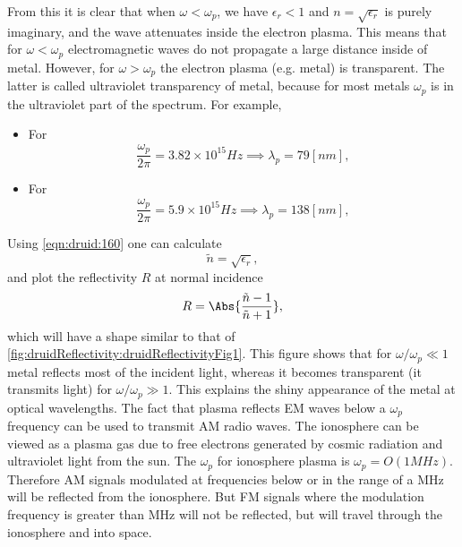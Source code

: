 %
From this it is clear that when \( \omega < \omega_p \), we have \( \epsilon_r < 1 \) and \( n = \sqrt{\epsilon_r} \) is purely imaginary, and the wave attenuates inside the electron plasma.
%
This means that for \( \omega < \omega_p \) electromagnetic waves do not propagate a large distance inside of metal.  However, for \( \omega > \omega_p \) the electron plasma (e.g. metal) is transparent.  The latter is called ultraviolet transparency of metal, because for most metals \( \omega_p \) is in the ultraviolet part of the spectrum.  For example,
%
\begin{itemize}
\item For 
\begin{dmath}\label{eqn:druid:180}
\frac{\omega_p}{2 \pi} = 3.82 \times 10^{15} \si{Hz} \implies \lambda_p = 79 [nm],
\end{dmath}
\item For 
\begin{dmath}\label{eqn:druid:200}
\frac{\omega_p}{2 \pi} = 5.9 \times 10^{15} \si{Hz} \implies \lambda_p = 138 [nm],
\end{dmath}
\end{itemize}
%
Using \cref{eqn:druid:160} one can calculate
%
\begin{dmath}\label{eqn:druid:220}
\tilde{n} = \sqrt{\epsilon_r},
\end{dmath}
%
and plot the reflectivity \( R \) at normal incidence
%
\begin{dmath}\label{eqn:druid:240}
R = \Abs{ \frac{\tilde{n} - 1 }{\tilde{n} + 1} },
\end{dmath}
%
which will have a shape similar to that of \cref{fig:druidReflectivity:druidReflectivityFig1}.
%
%
This figure shows that for \( \omega/\omega_p \ll 1 \) metal reflects most of the incident light, whereas it becomes transparent (it transmits light) for \( \omega/\omega_p \gg 1 \).  This explains the shiny appearance of the metal at optical wavelengths.
%
The fact that plasma reflects EM waves below a \( \omega_p \) frequency can be used to transmit AM radio waves.  The ionosphere can be viewed as a plasma gas due to free electrons generated by cosmic radiation and ultraviolet light from the sun.  The \( \omega_p \) for ionosphere plasma is \( \omega_p = O(1 \si{MHz}) \).  Therefore AM signals modulated at frequencies below or in the range of a \si{MHz} will be reflected from the ionosphere.  But FM signals where the modulation frequency is greater than \si{MHz} will not be reflected, but will travel through the ionosphere and into space.
%
